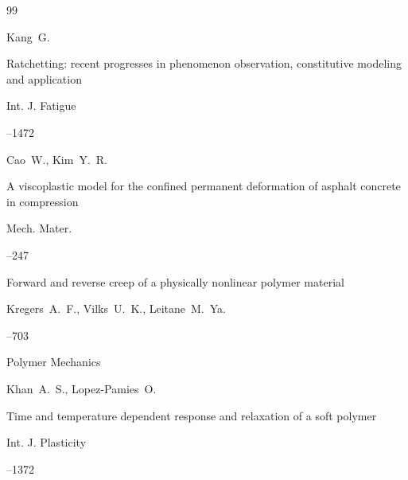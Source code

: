 \begin{thebibliography}{99}

\by Kang~G.

\paper Ratchetting: recent progresses in phenomenon observation, constitutive modeling and application

\jour Int. J. Fatigue




--1472







\by Cao~W., Kim~Y.~R.

\paper A viscoplastic model for the confined permanent deformation of asphalt concrete in compression 

\jour Mech. Mater.



--247







\paper Forward and reverse creep of a physically nonlinear polymer material

\by Kregers~A.~F., Vilks~U.~K.,  Leitane~M.~Ya.

--703

\jour Polymer Mechanics










\by Khan~A.~S., Lopez-Pamies~O.

\paper Time and temperature dependent response and relaxation of a soft polymer 

\jour Int. J. Plasticity




--1372







\end{thebibliography}
